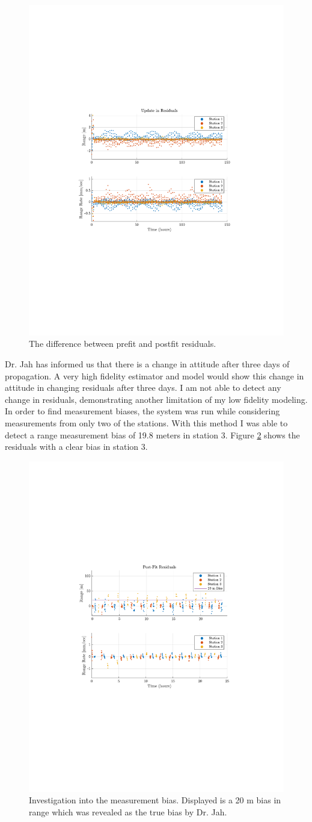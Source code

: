 \documentclass[11pt]{article}
\begin{document}
\begin{figure}[!htb]
	\centering
	\includegraphics[clip,trim=4cm 8.5cm 4cm 8.5cm, width=.5\textwidth]{figs/update_res.pdf}
	\caption{The difference between prefit and postfit residuals.}
	\label{fig:res_change}
\end{figure}

Dr. Jah has informed us that there is a change in attitude after three days of propagation. A very high fidelity estimator and model would show this change in attitude in changing residuals after three days. I am not able to detect any change in residuals, demonstrating another limitation of my low fidelity modeling. \\

In order to find measurement biases, the system was run while considering measurements from only two of the stations. With this method I was able to detect a range measurement bias of 19.8 meters in station 3. Figure \ref{fig:bias} shows the residuals with a clear bias in station 3. \\

\begin{figure}[!htb]
	\centering
	\includegraphics[clip,trim=4cm 8.5cm 4cm 8.5cm, width=.5\textwidth]{figs/bias.pdf}
	\caption{Investigation into the measurement bias. Displayed is a 20 m bias in range which was revealed as the true bias by Dr. Jah.}
	\label{fig:bias}
\end{figure}
\end{document}
